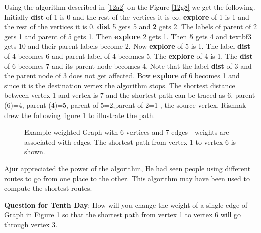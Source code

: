 Using the algorithm described in \ref{12a2} on the Figure \ref{12g8} we get the following.
Initially \textbf{dist} of 1 is 0 and the rest of the vertices it is $\infty$. \textbf{explore} of 1 is 1 and the rest of the vertices it is 0. \textbf{dist} 5 gets 5 and \textbf{2} gets 2. The labels of parent of 2 gets 1 and parent of 5 gets 1. Then \textbf{explore} 2 gets 1. Then \textbf{5} gets 4 and textbf{3} gets 10 and their parent labels become 2. Now \textbf{explore} of 5 is 1. The label \textbf{dist} of 4 becomes 6 and parent label of 4 becomes 5. The \textbf{explore} of 4 is 1. The \textbf{dist} of 6 becomes 7 and its parent node becomes 4. Note that the label \textbf{dist} of 3 and the parent node of 3 does not get affected. Bow \textbf{explore} of 6 becomes 1 and since it is the destination vertex the algorithm stops. The shortest distance between vertex 1 and vertex is 7 and the shortest path can be traced as 6, parent (6)=4, parent (4)=5, parent of 5=2,parent of 2=1 , the source vertex.
Rishnak drew the following figure \ref{12g9} to illustrate the path.

\begin{figure}
\begin{center}
\caption{ Example weighted Graph with 6 vertices and 7 edges - weights are associated with edges. The shortest path from vertex 1 to vertex 6 is shown.}\label{12g9}
\end{center}
\end{figure}

Ajur appreciated the power of the algorithm, He had seen people using different routes to go from one place to the other. This algorithm may have been used to compute the shortest routes. 

\textbf{Question for Tenth Day}: How will you change the weight of a single edge of Graph in Figure \ref{12g9} so that the shortest path from vertex 1 to vertex 6 will go through vertex 3.

